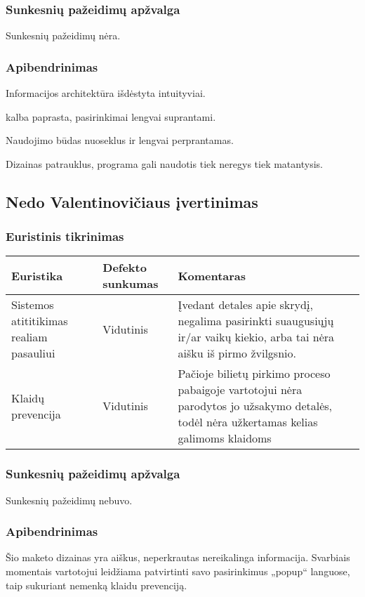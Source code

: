 \documentclass{VUMIFPSkursinis}
\begin{document}
\subsubsection{Sunkesnių pažeidimų apžvalga}
Sunkesnių pažeidimų nėra.

\subsubsection{Apibendrinimas}
Informacijos architektūra išdėstyta intuityviai.

kalba paprasta, pasirinkimai lengvai suprantami.

Naudojimo būdas nuoseklus ir lengvai perprantamas.

Dizainas  patrauklus, programa gali naudotis tiek neregys tiek matantysis.

\subsection{Nedo Valentinovičiaus įvertinimas}
\subsubsection{Euristinis tikrinimas}
\begin{center}
 \begin{tabular}{|| p{4cm} | p{4cm} | p{8cm} ||} 
 \hline
 Euristika & Defekto sunkumas & Komentaras \\
 \hline\hline
 Sistemos atititikimas realiam pasauliui & Vidutinis & Įvedant detales apie skrydį, negalima pasirinkti suaugusiųjų ir/ar vaikų kiekio, arba tai nėra aišku iš pirmo žvilgsnio. \\ 
 \hline
 Klaidų prevencija & Vidutinis & Pačioje bilietų pirkimo proceso pabaigoje vartotojui nėra parodytos jo užsakymo detalės, todėl nėra užkertamas kelias galimoms klaidoms \\
 \hline
\end{tabular}	
\end{center}

\subsubsection{Sunkesnių pažeidimų apžvalga}
Sunkesnių pažeidimų nebuvo.

\subsubsection{Apibendrinimas}
Šio maketo dizainas yra aiškus, neperkrautas nereikalinga informacija. Svarbiais momentais vartotojui leidžiama patvirtinti savo pasirinkimus „popup“ languose, taip sukuriant nemenką klaidu prevenciją.
\end{document}
